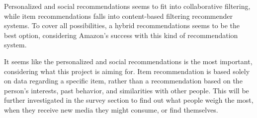 Personalized and social recommendations seems to fit into collaborative filtering, while item recommendations falls into content-based filtering recommender systems. To cover all possibilities, a hybrid recommendations seems to be the best option, considering Amazon’s success with this kind of recommendation system.

It seems like the personalized and social recommendations is the most important, considering what this project is aiming for. Item recommendation is based solely on data regarding a specific item, rather than a recommendation based on the person's interests, past behavior, and similarities with other people. This will be further investigated in the survey section to find out what people weigh the most, when they receive new media they might consume, or find themselves.